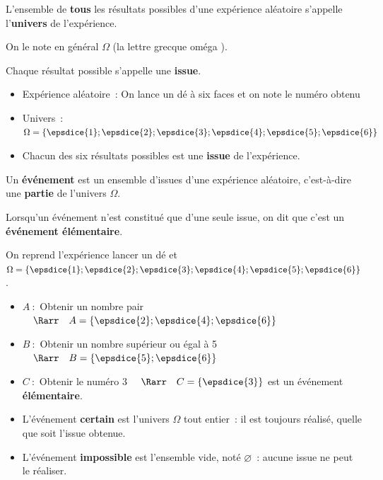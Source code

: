 \begin{defin}[Univers]
	L'ensemble de \textbf{tous} les résultats possibles d'une expérience aléatoire s'appelle l'\textbf{univers} de l'expérience.

	On le note en général $\Omega$ (la lettre grecque \og oméga \fg{}).

	Chaque résultat possible s'appelle une \textbf{issue}.
\end{defin}

\begin{ex}
	\nline
	\begin{itemize}
		\item Expérience aléatoire~: \og On lance un dé à six faces et on note le numéro obtenu \fg{}
		\item Univers~: $\Omega = \left\{ \epsdice{1};\epsdice{2};\epsdice{3};\epsdice{4};\epsdice{5};\epsdice{6} \right\}$
		\item Chacun des six résultats possibles est une \textbf{issue} de l'expérience.
	\end{itemize}
\end{ex}

\begin{defin}[Événement]
	Un \textbf{événement} est un ensemble d'issues d'une expérience aléatoire, c'est-à-dire une \textbf{partie} de l'univers $\Omega$.

	Lorsqu'un événement n'est constitué que d'une seule issue, on dit que c'est un \textbf{événement élémentaire}.
\end{defin}

\begin{ex}
	On reprend l'expérience \og lancer un dé \fg{} et $\Omega = \left\{ \epsdice{1};\epsdice{2};\epsdice{3};\epsdice{4};\epsdice{5};\epsdice{6} \right\}$.
	\begin{itemize}
		\item $A~:$ \og Obtenir un nombre pair \fg{} $\quad\Rarr\quad A = \left\{ \epsdice{2};\epsdice{4};\epsdice{6} \right\}$
		\item $B~:$ \og Obtenir un nombre supérieur ou égal à 5 \fg{} $\quad\Rarr\quad B = \left\{ \epsdice{5};\epsdice{6} \right\}$
		\item $C~:$ \og Obtenir le numéro 3 \fg{} $\quad\Rarr\quad C = \left\{ \epsdice{3} \right\}$ est un événement \textbf{élémentaire}.
	\end{itemize}
\end{ex}

\begin{rem}
	\nline
	\begin{itemize}
		\item L'événement \textbf{certain} est l'univers $\Omega$ tout entier~: il est toujours réalisé, quelle que soit l'issue obtenue.
		\item L'événement \textbf{impossible} est l'ensemble vide, noté $\varnothing$~: aucune issue ne peut le réaliser.
	\end{itemize}
\end{rem}

